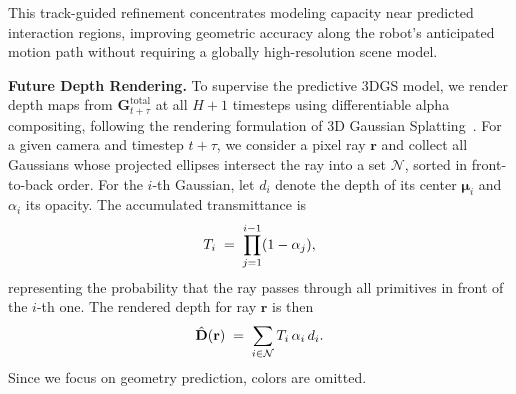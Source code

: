
This track-guided refinement concentrates modeling capacity near predicted interaction regions, improving geometric accuracy along the robot's anticipated motion path without requiring a globally high-resolution scene model.

\noindent 
\textbf{Future Depth Rendering.}
%
To supervise the predictive 3DGS model, we render depth maps from $\mathbf{G}^{\text{total}}_{t+\tau}$ at all $H{+}1$ timesteps using differentiable alpha compositing, following the rendering formulation of 3D Gaussian Splatting~\cite{kerbl20233d}. For a given camera and timestep $t{+}\tau$, we consider a pixel ray $\mathbf{r}$ and collect all Gaussians whose projected ellipses intersect the ray into a set $\mathcal{N}$, sorted in front-to-back order. For the $i$-th Gaussian, let $d_i$ denote the depth of its center $\bm{\mu}_i$ and $\alpha_i$ its opacity. The accumulated transmittance is
\vspace{-5pt}
\begin{equation}
T_i \;=\; \prod_{j=1}^{i-1} (1 - \alpha_j),
\vspace{-5pt}
\end{equation}
representing the probability that the ray passes through all primitives in front of the $i$-th one. The rendered depth for ray $\mathbf{r}$ is then
\vspace{-5pt}
\begin{equation}
\vspace{-5pt}
\hat{\mathbf{D}}(\mathbf{r}) \;=\; \sum_{i\in\mathcal{N}} T_i\,\alpha_i\, d_i.
\end{equation}
Since we focus on geometry prediction, colors are omitted.



